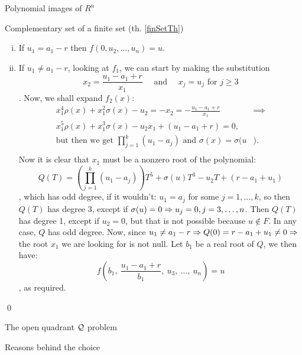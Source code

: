 \documentclass[11pt, a4paper, english, twoside, notitlepage]{report}
\begin{document}
\begin{chapter}{Polynomial images of $R^n$}
\begin{section}{Complementary set of a finite set (th. \ref{finSetTh})}
\begin{Proof}
\begin{enumerate}[(i)]
			\item If $u_1=a_1-r$ then $f(0,u_2,\dots,u_n)=u$.
		
			\item If $u_1\neq a_1-r$, looking at $f_1$, we can start by making the substitution $$x_2=\frac{u_1 - a_1 + r}{x_1} \quad \text{ and } \quad x_j = u_j \text{ for } j\geq 3$$. Now, we shall expand $f_2(x)$:
			\begin{align*}
				x_1^4\rho(x) + x_1^2\sigma(x) - u_2 = - x_2 = - \frac{u_1 - a_1 + r}{x_1} & \implies \\
				x_1^5\rho(x) + x_1^3\sigma(x) - u_2 x_1 + (u_1 - a_1 + r) = 0, \\
				\text{but then we get }  \prod_{j = 1}^k(u_1 - a_j) \text{ and } \sigma(x) = \sigma(u&). \\
			\end{align*}
			Now it is clear that $x_1$ must be a nonzero root of the polynomial:
			$$
			Q(T)=\left(\prod_{j=1}^k(u_1-a_j)\right)T^{5}+\sigma(u)T^{3}-u_2T+(r-a_1+u_1)
			$$
			, which has odd degree, if it wouldn't: $u_1= a_j$ for some $j = 1, \dots, k$, so then $Q(T)$ has degree 3, except if $\sigma(u) = 0 \Rightarrow u_j = 0, j = 3, \dots, n$. Then $Q(T)$ has degree 1, except if $u_2 = 0$, but that is not possible because $u\not\in F$. In any case, $Q$ has odd degree. Now, since $u_1\neq a_1 - r \Rightarrow Q(0) = r - a_1 + u_1 \neq 0 \Rightarrow$ the root $x_1$ we are looking for is not null. Let $b_1$ be a real root of $Q$, we then have:
			$$
			f\left(b_1,\ \frac{u_1-a_1+r}{b_1},\ u_3,\ \dots,\ u_n\right) = u
			$$
			, as required.
		\end{enumerate}
		\qed
	\end{Proof}
	
\end{section}

\begin{section}{The open quadrant $\mathcal{Q}$ problem}
	
	\begin{subsection}{Reasons behind the choice}\label{quadReasons}
		

\end{subsection}
\end{section}
\end{chapter}
\end{document}
